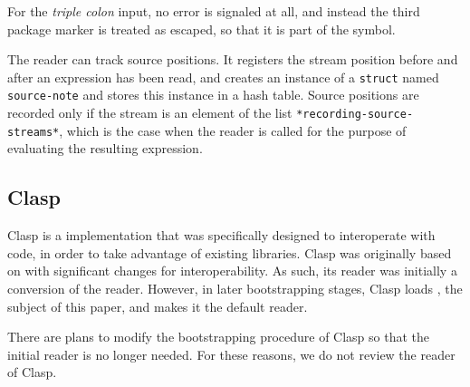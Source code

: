 \noindent
For the \emph{triple colon} input, no error is signaled at all, and
instead the third package marker is treated as escaped, so that it is
part of the symbol.

The \ccl{} reader can track source positions.  It registers the stream
position before and after an expression has been read, and creates an
instance of a \texttt{struct} named \texttt{source-note} and stores
this instance in a hash table.  Source positions are recorded only if
the stream is an element of the list
\texttt{*recording-source-streams*}, which is the case when the reader
is called for the purpose of evaluating the resulting expression.

\subsection{Clasp}

Clasp is a \cl{} implementation that was specifically designed to
interoperate with \cplusplus{} code, in order to take advantage of
existing \cplusplus{} libraries.  Clasp was originally based on \ecl{}
with significant changes for \cplusplus{} interoperability.  As such,
its reader was initially a \cplusplus{} conversion of the \ecl{}
reader.  However, in later bootstrapping stages, Clasp loads
\eclector{}, the subject of this paper, and makes it the default
reader.

There are plans to modify the bootstrapping procedure of Clasp so that
the initial \cplusplus{} reader is no longer needed.  For these
reasons, we do not review the \cplusplus{} reader of Clasp.

